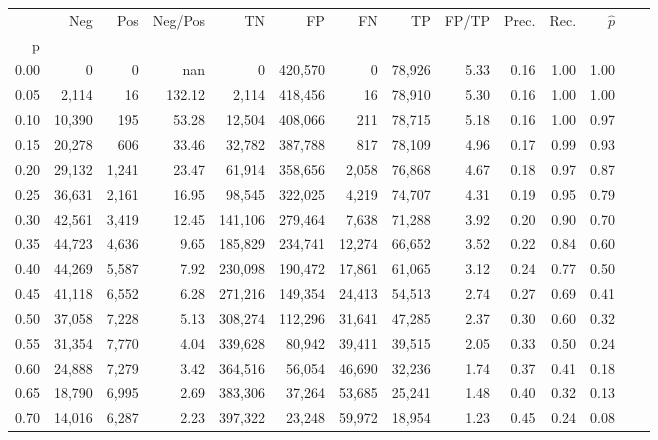 \begin{tabular}{rrrrrrrrrrrrrr}
\toprule
{} &     Neg &    Pos & Neg/Pos &       TN &       FP &      FN &      TP & FP/TP & Prec. &  Rec. & $\hat{p}$ \\
p    &         &        &         &          &          &         &         &       &       &       &           \\
\midrule
0.00 &       0 &      0 &     nan &        0 &  420,570 &       0 &  78,926 &  5.33 &  0.16 &  1.00 &      1.00 \\
0.05 &   2,114 &     16 &  132.12 &    2,114 &  418,456 &      16 &  78,910 &  5.30 &  0.16 &  1.00 &      1.00 \\
0.10 &  10,390 &    195 &   53.28 &   12,504 &  408,066 &     211 &  78,715 &  5.18 &  0.16 &  1.00 &      0.97 \\
0.15 &  20,278 &    606 &   33.46 &   32,782 &  387,788 &     817 &  78,109 &  4.96 &  0.17 &  0.99 &      0.93 \\
0.20 &  29,132 &  1,241 &   23.47 &   61,914 &  358,656 &   2,058 &  76,868 &  4.67 &  0.18 &  0.97 &      0.87 \\
0.25 &  36,631 &  2,161 &   16.95 &   98,545 &  322,025 &   4,219 &  74,707 &  4.31 &  0.19 &  0.95 &      0.79 \\
0.30 &  42,561 &  3,419 &   12.45 &  141,106 &  279,464 &   7,638 &  71,288 &  3.92 &  0.20 &  0.90 &      0.70 \\
0.35 &  44,723 &  4,636 &    9.65 &  185,829 &  234,741 &  12,274 &  66,652 &  3.52 &  0.22 &  0.84 &      0.60 \\
0.40 &  44,269 &  5,587 &    7.92 &  230,098 &  190,472 &  17,861 &  61,065 &  3.12 &  0.24 &  0.77 &      0.50 \\
0.45 &  41,118 &  6,552 &    6.28 &  271,216 &  149,354 &  24,413 &  54,513 &  2.74 &  0.27 &  0.69 &      0.41 \\
0.50 &  37,058 &  7,228 &    5.13 &  308,274 &  112,296 &  31,641 &  47,285 &  2.37 &  0.30 &  0.60 &      0.32 \\
0.55 &  31,354 &  7,770 &    4.04 &  339,628 &   80,942 &  39,411 &  39,515 &  2.05 &  0.33 &  0.50 &      0.24 \\
0.60 &  24,888 &  7,279 &    3.42 &  364,516 &   56,054 &  46,690 &  32,236 &  1.74 &  0.37 &  0.41 &      0.18 \\
0.65 &  18,790 &  6,995 &    2.69 &  383,306 &   37,264 &  53,685 &  25,241 &  1.48 &  0.40 &  0.32 &      0.13 \\
0.70 &  14,016 &  6,287 &    2.23 &  397,322 &   23,248 &  59,972 &  18,954 &  1.23 &  0.45 &  0.24 &      0.08 \\

\end{tabular}
